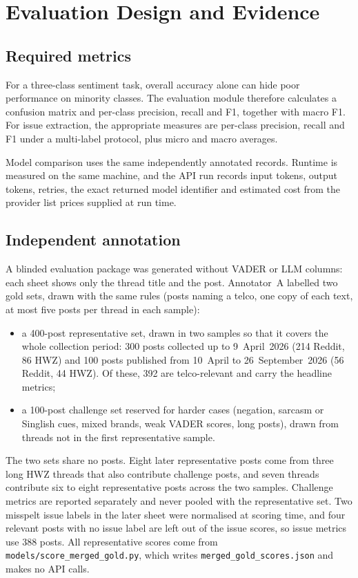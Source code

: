 \documentclass[11pt,a4paper]{article}
\begin{document}
\section{Evaluation Design and Evidence}

\subsection{Required metrics}

For a three-class sentiment task, overall accuracy alone can hide poor performance on minority classes. The evaluation module therefore calculates a confusion matrix and per-class precision, recall and F1, together with macro F1. For issue extraction, the appropriate measures are per-class precision, recall and F1 under a multi-label protocol, plus micro and macro averages.

Model comparison uses the same independently annotated records. Runtime is measured on the same machine, and the API run records input tokens, output tokens, retries, the exact returned model identifier and estimated cost from the provider list prices supplied at run time.

\subsection{Independent annotation}

A blinded evaluation package was generated without VADER or LLM columns: each sheet shows only the thread title and the post. Annotator~A labelled two gold sets, drawn with the same rules (posts naming a telco, one copy of each text, at most five posts per thread in each sample):

\begin{itemize}
  \item a 400-post representative set, drawn in two samples so that it covers the whole collection period: 300 posts collected up to 9~April~2026 (214 Reddit, 86 HWZ) and 100 posts published from 10~April to 26~September~2026 (56 Reddit, 44 HWZ). Of these, 392 are telco-relevant and carry the headline metrics;
  \item a 100-post challenge set reserved for harder cases (negation, sarcasm or Singlish cues, mixed brands, weak VADER scores, long posts), drawn from threads not in the first representative sample.
\end{itemize}

The two sets share no posts. Eight later representative posts come from three long HWZ threads that also contribute challenge posts, and seven threads contribute six to eight representative posts across the two samples. Challenge metrics are reported separately and never pooled with the representative set. Two misspelt issue labels in the later sheet were normalised at scoring time, and four relevant posts with no issue label are left out of the issue scores, so issue metrics use 388 posts. All representative scores come from \texttt{models/score\_merged\_gold.py}, which writes \texttt{merged\_gold\_scores.json} and makes no API calls.
\end{document}
